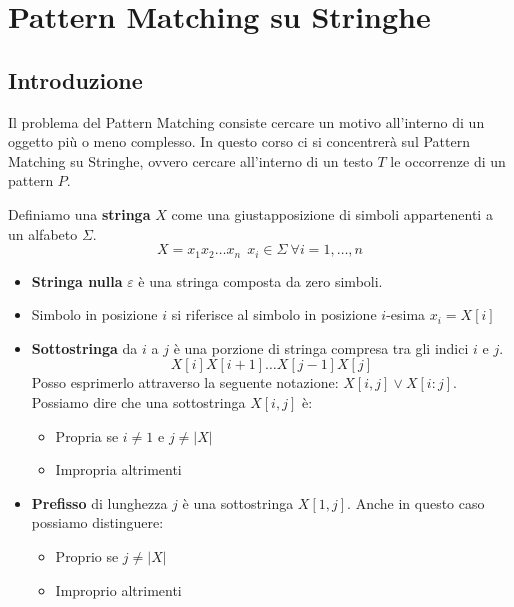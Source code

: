 \chapter{Pattern Matching su Stringhe}
\section{Introduzione}
Il problema del Pattern Matching consiste cercare un motivo all'interno di un oggetto
più o meno complesso. In questo corso ci si concentrerà sul Pattern Matching su
Stringhe, ovvero cercare all'interno di un testo $T$ le occorrenze di un pattern $P$.
\begin{definizione}
    Definiamo una \textbf{stringa} $X$ come una giustapposizione di simboli
    appartenenti a un alfabeto $\Sigma$.
    \begin{equation}
        X=x_1x_2\dots x_n \ \ x_i \in \Sigma \ \forall i = 1, \dots, n
    \end{equation}
    \begin{itemize}
        \item \textbf{Stringa nulla} $\varepsilon$ è una stringa composta da zero
              simboli.
        \item Simbolo in posizione $i$ si riferisce al simbolo in posizione $i$-esima
              $x_i = X[i]$
        \item \textbf{Sottostringa} da $i$ a $j$ è una porzione di stringa compresa
              tra gli indici $i$ e $j$.
              \begin{equation}
                  X[i]X[i+1]\dots X[j - 1]X[j]
              \end{equation}
              Posso esprimerlo attraverso la seguente notazione: $X[i, j] \lor X[i:j]$.
              Possiamo dire che una sottostringa $X[i, j]$ è:
              \begin{itemize}
                  \item Propria se $i \neq 1$ e $j \neq |X|$
                  \item Impropria altrimenti
              \end{itemize}
        \item \textbf{Prefisso} di lunghezza $j$ è una sottostringa $X[1, j]$.
              Anche in questo caso possiamo distinguere:
              \begin{itemize}
                  \item Proprio se $j \neq |X|$
                  \item Improprio altrimenti

\end{itemize}
\end{itemize}
\end{definizione}
